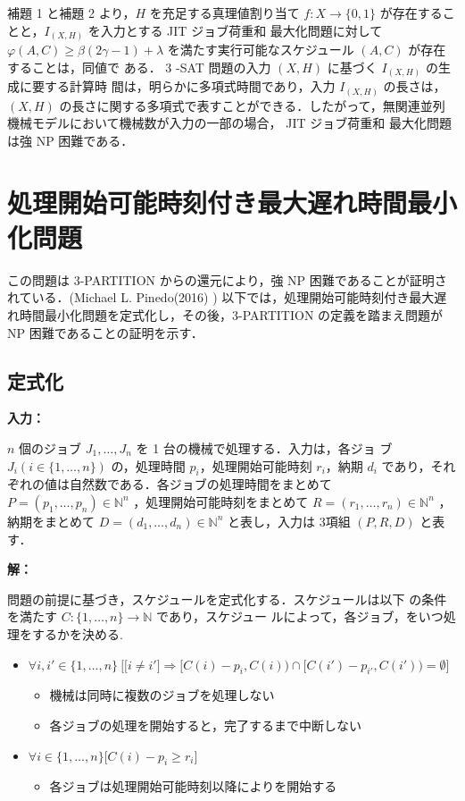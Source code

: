 \documentclass[12pt]{optlab-bachelor}
\begin{document}
  補題 1 と補題 2 より，$H$ を充足する真理値割り当て $f : X \to \{0,
  1\}$ が存在することと，$I_{(X,H)}$ を入力とする JIT ジョブ荷重和
  最大化問題に対して $\varphi(A, C) \ge \beta(2\gamma − 1) + \lambda$
  を満たす実行可能なスケジュール $(A, C)$ が存在することは，同値で
  ある．
  3 -SAT 問題の入力 $(X,H)$ に基づく $I_{(X,H)}$ の生成に要する計算時
  間は，明らかに多項式時間であり，入力 $I_{(X,H)}$ の長さは，$(X, H)$
  の長さに関する多項式で表すことができる．したがって，無関連並列
  機械モデルにおいて機械数が入力の一部の場合， JIT ジョブ荷重和
  最大化問題は強 NP 困難である．

  \section{処理開始可能時刻付き最大遅れ時間最小化問題} %

  この問題は 3-PARTITION からの還元により，強 NP 困難であることが証明さ
  れている．(Michael L. Pinedo(2016) \cite{Lmax})
  以下では，処理開始可能時刻付き最大遅れ時間最小化問題を定式化し，その後，3-PARTITION の定義を踏まえ問題が NP 困難であることの証明を示す．
  \subsection{定式化}
  \noindent \textbf{入力：}

  $n$ 個のジョブ $J_1,\ldots,J_n$ を 1 台の機械で処理する．入力は，各ジョ
  ブ $J_i ( i \in \{1,\ldots,n\} )$ の，処理時間 $p_i$，処理開始可能時刻
  $r_i$，納期 $d_i$ であり，それぞれの値は自然数である．各ジョブの処理時間をまとめて $P =
  (p_1,\ldots,p_n) \in \mathbb{N}^n$ ，処理開始可能時刻をまとめて $R =
  (r_1,\ldots,r_n) \in \mathbb{N}^n$ ，納期をまとめて $D =
  (d_1,\ldots,d_n) \in \mathbb{N}^n$ と表し，入力は 3項組 $(P,R,D)$ と表
  す．

  \noindent \textbf{解：}

  問題の前提に基づき，スケジュールを定式化する．スケジュールは以下
  の条件を満たす $C : \{1,\ldots,n\} \to \mathbb{N}$ であり，スケジュー
  ルによって，各ジョブ，をいつ処理をするかを決める.
  \begin{itemize}
    \item $\forall i, i' \in \{1,\ldots,n\}\ \Big[ \big[i \neq i' \big] \Rightarrow [C(i) - p_i, C(i)) \cap [C(i') - p_{i'}, C(i')) = \emptyset \Big]$
    \begin{itemize}
      \item 機械は同時に複数のジョブを処理しない
      \item 各ジョブの処理を開始すると，完了するまで中断しない
    \end{itemize}
    \item  $\forall i \in \{1,\ldots,n\}\big[C(i) - p_i \ge r_i\big]$
    \begin{itemize}
      \item 各ジョブは処理開始可能時刻以降によりを開始する
    \end{itemize}
  \end{itemize}
\end{document}
